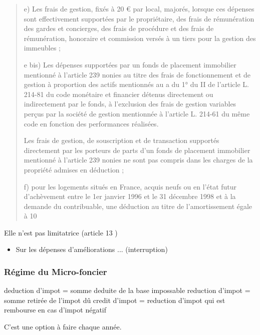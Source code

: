 \begin{quote}
	e) Les frais de gestion, fixés à 20 € par local, majorés, lorsque ces dépenses sont effectivement supportées par le propriétaire, des frais de rémunération des gardes et concierges, des frais de procédure et des frais de rémunération, honoraire et commission versés à un tiers pour la gestion des immeubles ;

	e bis) Les dépenses supportées par un fonds de placement immobilier mentionné à l'article 239 nonies au titre des frais de fonctionnement et de gestion à proportion des actifs mentionnés au a du 1° du II de l'article L. 214-81 du code monétaire et financier détenus directement ou indirectement par le fonds, à l'exclusion des frais de gestion variables perçus par la société de gestion mentionnée à l'article L. 214-61 du même code en fonction des performances réalisées.

	Les frais de gestion, de souscription et de transaction supportés directement par les porteurs de parts d'un fonds de placement immobilier mentionné à l'article 239 nonies ne sont pas compris dans les charges de la propriété admises en déduction ;

	f) pour les logements situés en France, acquis neufs ou en l'état futur d'achèvement entre le 1er janvier 1996 et le 31 décembre 1998 et à la demande du contribuable, une déduction au titre de l'amortissement égale à 10 %
				\end{quote}


			Elle n'est pas limitatrice (article 13 )

			\begin{itemize}
				\item Sur les dépenses d'améliorations ... (interruption)
			\end{itemize}

			\subsubsection{Régime du Micro-foncier}

			deduction d'impot = somme deduite de la base impossable
			reduction d'impot = somme retirée de l'impot dû
			credit d'impot = reduction d'impot qui est rembourse en cas d'impot négatif

			C'est une option à faire chaque année.

